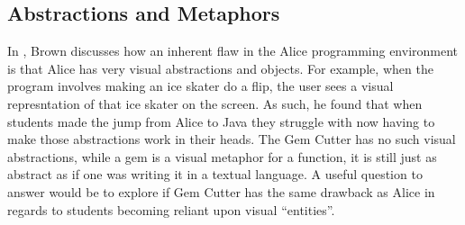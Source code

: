 \subsection{Abstractions and Metaphors}

In \cite{brown08}, Brown discusses how an inherent flaw in the Alice programming environment is that Alice has very visual abstractions and objects.  For example, when the program involves making an ice skater do a flip, the user sees a visual represntation of that ice skater on the screen.  As such, he found that when students made the jump from Alice to Java they struggle with now having to make those abstractions work in their heads.  The Gem Cutter has no such visual abstractions, while a gem is a visual metaphor for a function, it is still just as abstract as if one was writing it in a textual language.  A useful question to answer would be to explore if Gem Cutter has the same drawback as Alice in regards to students becoming reliant upon visual ``entities''.
